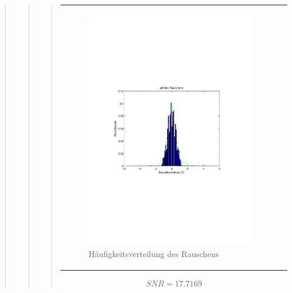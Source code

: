 \begin{quote}
\begin{quote}
\begin{quote}
\begin{center}
\begin{tabular}{ll}
            \begin{minipage}{0.6\textwidth}
                \begin{figure}[H]
                    \includegraphics[scale=0.7, trim = 15mm 80mm 20mm 90mm, clip]{Bilder/hist20}
                    \caption{Häufigkeitsverteilung des Rauschens}
                    \label{fig:hist20}
                \end{figure}
            
            \end{minipage}
        
        \end{tabular}
        \end{center}
            
            \vspace{2em}
            
            \begin{equation*}
            \begin{split}
                 SNR = 17.7169
            \end{split}
            \end{equation*}
            

\end{quote}
\end{quote}
\end{quote}
